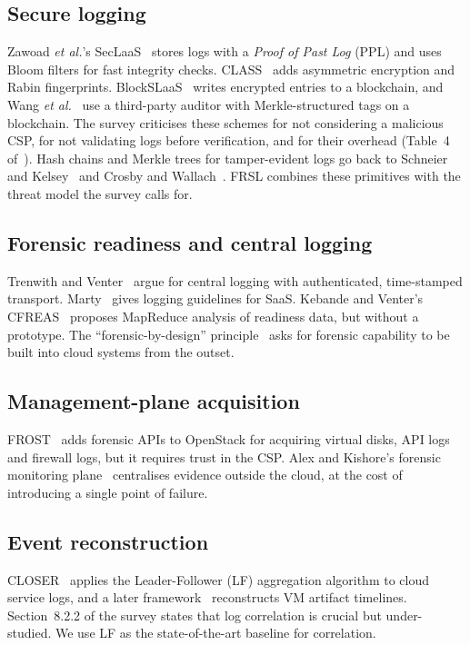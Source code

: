 \documentclass[conference,10pt]{IEEEtran}
\begin{document}
\subsection{Secure logging}
Zawoad \textit{et al.}'s SecLaaS~\cite{zawoad2016} stores logs with a \emph{Proof of Past Log} (PPL) and uses Bloom filters for fast integrity checks. CLASS~\cite{ahsan2018} adds asymmetric encryption and Rabin fingerprints. BlockSLaaS~\cite{rane2019} writes encrypted entries to a blockchain, and Wang \textit{et al.}~\cite{wang2019} use a third-party auditor with Merkle-structured tags on a blockchain. The survey criticises these schemes for not considering a malicious CSP, for not validating logs before verification, and for their overhead (Table~4 of~\cite{manral2019}). Hash chains and Merkle trees for tamper-evident logs go back to Schneier and Kelsey~\cite{schneier1999} and Crosby and Wallach~\cite{crosby2009}. FRSL combines these primitives with the threat model the survey calls for.

\subsection{Forensic readiness and central logging}
Trenwith and Venter~\cite{trenwith2013} argue for central logging with authenticated, time-stamped transport. Marty~\cite{marty2011} gives logging guidelines for SaaS. Kebande and Venter's CFREAS~\cite{kebande2015} proposes MapReduce analysis of readiness data, but without a prototype. The ``forensic-by-design'' principle~\cite{abrahman2016} asks for forensic capability to be built into cloud systems from the outset.

\subsection{Management-plane acquisition}
FROST~\cite{dykstra2013} adds forensic APIs to OpenStack for acquiring virtual disks, API logs and firewall logs, but it requires trust in the CSP. Alex and Kishore's forensic monitoring plane~\cite{alex2017} centralises evidence outside the cloud, at the cost of introducing a single point of failure.

\subsection{Event reconstruction}
CLOSER~\cite{raju2017} applies the Leader-Follower (LF) aggregation algorithm to cloud service logs, and a later framework~\cite{raju2018} reconstructs VM artifact timelines. Section~8.2.2 of the survey states that log correlation is crucial but under-studied. We use LF as the state-of-the-art baseline for correlation.
\end{document}
